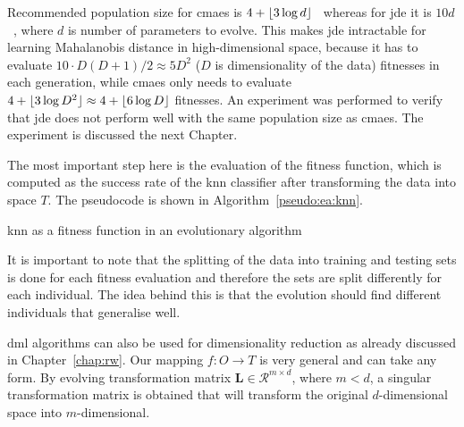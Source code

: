 \documentclass[12pt,a4paper]{report}
\begin{document}
Recommended population size for \ac{cmaes} is $4+\lfloor3\log{d}\rfloor$~\citep{hansen2006cma} whereas for \ac{jde} it is $10d$~\citep{brest2006self}, where $d$ is number of parameters to evolve. This makes \ac{jde} intractable for learning Mahalanobis distance in high-dimensional space, because it has to evaluate $10\cdot D(D+1)/2 \approx 5D^2$ ($D$ is dimensionality of the data) fitnesses in each generation, while \ac{cmaes} only needs to evaluate $4+\lfloor3\log{D^2}\rfloor \approx 4+\lfloor6\log{D}\rfloor$ fitnesses. An experiment was performed to verify that \ac{jde} does not perform well with the same population size as \ac{cmaes}. The experiment is discussed the next Chapter.

The most important step here is the evaluation of the fitness function, which is computed as the success rate of the \ac{knn} classifier after transforming the data into space $T$. The pseudocode is shown in Algorithm~\ref{pseudo:ea:knn}.

\begin{algorithm}[t]
\caption{\ac{knn} as a fitness function in an evolutionary algorithm} \label{pseudo:ea:knn}
\DontPrintSemicolon
\LinesNumbered
{}
\end{algorithm}

It is important to note that the splitting of the data into training and testing sets is done for each fitness evaluation and therefore the sets are split differently for each individual. The idea behind this is that the evolution should find different individuals that generalise well.

\Ac{dml} algorithms can also be used for dimensionality reduction as already discussed in Chapter~\ref{chap:rw}. Our mapping $f: O \to T$ is very general and can take any form. By evolving transformation matrix $\bm{L} \in \mathcal{R}^{m\times d}$, where $m < d$, a singular transformation matrix is obtained that will transform the original $d$-dimensional space into $m$-dimensional.
\end{document}
